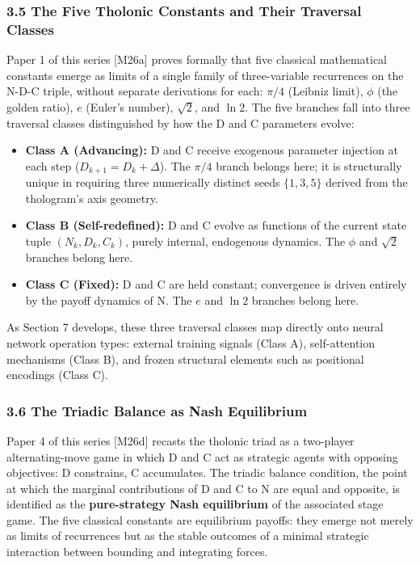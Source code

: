 \documentclass[
  11pt,
  letterpaper,
]{article}
\providecommand{\tightlist}{%
  \setlength{\itemsep}{0pt}\setlength{\parskip}{0pt}}
\begin{document}
\subsubsection{3.5 The Five Tholonic Constants and Their Traversal
Classes}\label{the-five-tholonic-constants-and-their-traversal-classes}

Paper 1 of this series {[}M26a{]} proves formally that five classical
mathematical constants emerge as limits of a single family of
three-variable recurrences on the N-D-C triple, without separate
derivations for each: \(\pi/4\) (Leibniz limit), \(\phi\) (the golden
ratio), \(e\) (Euler's number), \(\sqrt{2}\), and \(\ln 2\). The five
branches fall into three traversal classes distinguished by how the D
and C parameters evolve:

\begin{itemize}
\tightlist
\item
  \textbf{Class A (Advancing):} D and C receive exogenous parameter
  injection at each step (\(D_{k+1} = D_k + \Delta\)). The \(\pi/4\)
  branch belongs here; it is structurally unique in requiring three
  numerically distinct seeds \(\{1, 3, 5\}\) derived from the
  thologram's axis geometry.
\item
  \textbf{Class B (Self-redefined):} D and C evolve as functions of the
  current state tuple \((N_k, D_k, C_k)\), purely internal, endogenous
  dynamics. The \(\phi\) and \(\sqrt{2}\) branches belong here.
\item
  \textbf{Class C (Fixed):} D and C are held constant; convergence is
  driven entirely by the payoff dynamics of N. The \(e\) and \(\ln 2\)
  branches belong here.
\end{itemize}

As Section 7 develops, these three traversal classes map directly onto
neural network operation types: external training signals (Class A),
self-attention mechanisms (Class B), and frozen structural elements such
as positional encodings (Class C).

\subsubsection{3.6 The Triadic Balance as Nash
Equilibrium}\label{the-triadic-balance-as-nash-equilibrium}

Paper 4 of this series {[}M26d{]} recasts the tholonic triad as a
two-player alternating-move game in which D and C act as strategic
agents with opposing objectives: D constrains, C accumulates. The
triadic balance condition, the point at which the marginal contributions
of D and C to N are equal and opposite, is identified as the
\textbf{pure-strategy Nash equilibrium} of the associated stage game.
The five classical constants are equilibrium payoffs: they emerge not
merely as limits of recurrences but as the stable outcomes of a minimal
strategic interaction between bounding and integrating forces.
\end{document}

